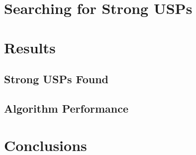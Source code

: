 \documentclass[11pt]{article}
\begin{document}
\section{Searching for Strong USPs}
\label{sec:search}

\section{Results}
\label{sec:results}

\subsection{Strong USPs Found}
\label{subsec:usps_found}

\subsection{Algorithm Performance}
\label{subsec:performance}

\section{Conclusions}
\label{sec:conclusion}

 

\appendix
\end{document}
